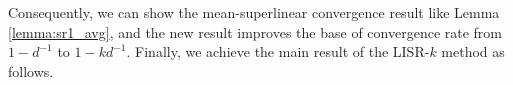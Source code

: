 \documentclass[letterpaper]{article} %
\theoremstyle{plain}
\newtheorem{lemma}[theorem]{Lemma}
\theoremstyle{definition}
\theoremstyle{remark}
\DeclarePairedDelimiter\ceil{\lceil}{\rceil}
\newcommand\norm[1]{\left\lVert#1\right\rVert}
\begin{document}
Consequently, we can show the mean-superlinear convergence result like Lemma \ref{lemma:sr1_avg}, and the new result improves the base of convergence rate from $1-d^{-1}$ to $1-kd^{-1}$. 
Finally, we achieve the main result of the LISR-$k$ method as follows.
\end{document}
